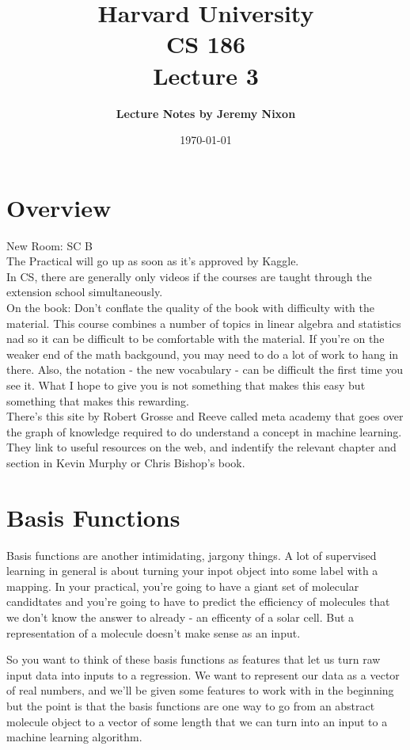 \documentclass[12pt]{article}   	%
\title{\bf \large Harvard University\\ CS 186\\ \vspace{0.15in} Lecture 3}
\author{ \bf \large Lecture Notes by  Jeremy Nixon}
\date{\today}
\begin{document}
\maketitle
\section{Overview}

New Room: SC B\\

\noindent
The Practical will go up as soon as it's approved by Kaggle.\\

\noindent
In CS, there are generally only videos if the courses are taught through the extension school simultaneously.\\

\noindent
On the book: Don't conflate the quality of the book with difficulty with the material. This course combines a number of topics in linear algebra and statistics nad so it can be difficult to be comfortable with the material. If you're on the weaker end of the math backgound, you may need to do a lot of work to hang in there. Also, the notation - the new vocabulary - can be difficult the first time you see it. What I hope to give you is not something that makes this easy but something that makes this rewarding.\\

\noindent
There's this site by Robert Grosse and Reeve called meta academy that goes over the graph of knowledge required to do understand a concept in machine learning. They link to useful resources on the web, and indentify the relevant chapter and section in Kevin Murphy or Chris Bishop's book.

\section{Basis Functions}

Basis functions are another intimidating, jargony things. A lot of supervised learning in general is about turning your inpot object into some label with a mapping. In your practical, you're going to have a giant set of molecular candidtates and you're going to have to predict the efficiency of molecules that we don't know the answer to already - an efficenty of a solar cell. But a representation of a molecule doesn't make sense as an input.

\noindent
So you want to think of these basis functions as features that let us turn raw input data into inputs to a regression. We want to represent our data as a vector of real numbers, and we'll be given some features to work with in the beginning but the point is that the basis functions are one way to go from an abstract molecule object to a vector of some length that we can turn into an input to a machine learning algorithm. \\
\end{document}
